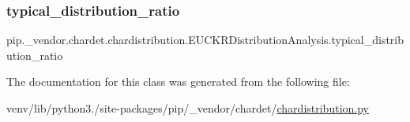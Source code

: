 \subsubsection{\texorpdfstring{typical\+\_\+distribution\+\_\+ratio}{typical\_distribution\_ratio}}
{\footnotesize\ttfamily pip.\+\_\+vendor.\+chardet.\+chardistribution.\+E\+U\+C\+K\+R\+Distribution\+Analysis.\+typical\+\_\+distribution\+\_\+ratio}



The documentation for this class was generated from the following file\+:\begin{DoxyCompactItemize}
\item 
venv/lib/python3./site-\/packages/pip/\+\_\+vendor/chardet/\hyperlink{chardistribution_8py}{chardistribution.\+py}\end{DoxyCompactItemize}
